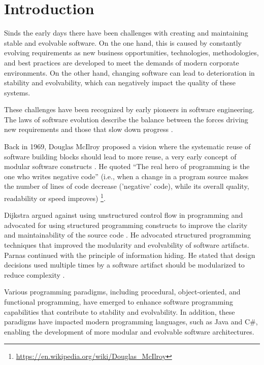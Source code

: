 \chapter{Introduction} \label{chap_introduction}

Sinds the early days there have been challenges with creating and maintaining stable and
evolvable software. On the one hand, this is caused by constantly evolving requirements as
new business opportunities, technologies, methodologies, and best practices are developed
to meet the demands of modern corporate environments. On the other hand, changing software
can lead to deterioration in stability and evolvability, which can negatively impact the
quality of these systems.

These challenges have been recognized by early pioneers in software engineering. The laws
of software evolution describe the balance between the forces driving new requirements
and those that slow down progress \parencite{lehman_programs_1980}.

Back in 1969, Douglas McIlroy proposed a vision where the systematic reuse of software
building blocks should lead to more reuse, a very early concept of modular software
constructs \parencite[79]{p_naur_nato_1968}. He quoted \enquote{The real hero of
programming is the one who writes negative code} (i.e., when a change in a program source
makes the number of lines of code decrease ('negative' code), while its overall quality,
readability or speed improves)
\footnote{\url{https://en.wikipedia.org/wiki/Douglas_McIlroy}}.

Dijkstra argued against using unstructured control flow in programming and advocated for
using structured programming constructs to improve the clarity and maintainability of the
source code \parencite{dijkstra_letters_1968}. He advocated structured programming
techniques that improved the modularity and evolvability of software artifacts. Parnas
continued with the principle of information hiding. He stated that design decisions used
multiple times by a software artifact should be modularized to reduce complexity
\parencite{parnas_criteria_1972}. 

Various programming paradigms, including procedural, object-oriented, and functional
programming, have emerged to enhance software programming capabilities that contribute to
stability and evolvability. In addition, these paradigms have impacted modern programming
languages, such as Java and C\#, enabling the development of more modular and evolvable
software architectures.

